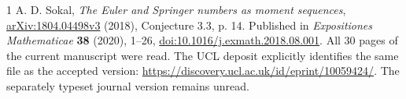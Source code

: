 \documentclass[11pt]{article}
\begin{document}
\begin{thebibliography}{1}
 A. D. Sokal, \emph{The Euler and Springer numbers as moment
sequences}, \href{https://arxiv.org/abs/1804.04498}{arXiv:1804.04498v3}
(2018), Conjecture 3.3, p. 14. Published in \emph{Expositiones Mathematicae}
\textbf{38} (2020), 1--26,
\href{https://doi.org/10.1016/j.exmath.2018.08.001}{doi:10.1016/j.exmath.2018.08.001}.
All 30 pages of the current manuscript were read. The UCL deposit explicitly
identifies the same file as the accepted version:
\url{https://discovery.ucl.ac.uk/id/eprint/10059424/}.
The separately typeset journal version remains unread.
\end{thebibliography}
\end{document}
